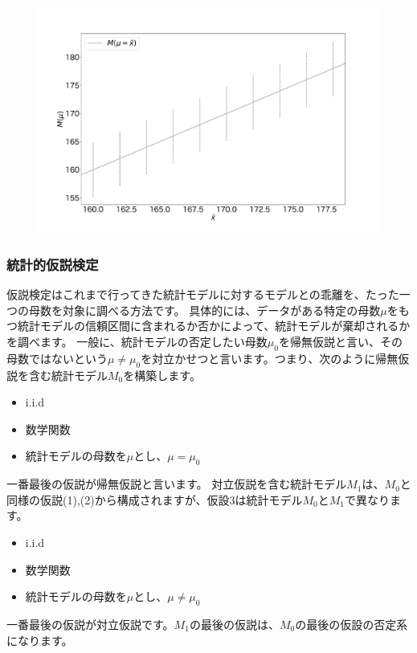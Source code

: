 \begin{figure}
\begin{center}
    \includegraphics[width=15cm]{./image/04_/confidence_interval_model.pdf}
  \end{center}
\end{figure}

\subsubsection{統計的仮説検定}
仮説検定はこれまで行ってきた統計モデルに対するモデルとの乖離を、たった一つの母数を対象に調べる方法です。
具体的には、データがある特定の母数$\mu$をもつ統計モデルの信頼区間に含まれるか否かによって、統計モデルが棄却されるかを調べます。
一般に、統計モデルの否定したい母数$\mu_0$を帰無仮説と言い、その母数ではないという$\mu\neq\mu_0$を対立かせつと言います。つまり、次のように帰無仮説を含む統計モデル$M_0$を構築します。
\begin{itemize}
    \item i.i.d
    \item 数学関数
    \item 統計モデルの母数を$\mu$とし、$\mu=\mu_0$
\end{itemize}
一番最後の仮説が帰無仮説と言います。
対立仮説を含む統計モデル$M_1$は、$M_0$と同様の仮説(1),(2)から構成されますが、仮設3は統計モデル$M_0$と$M_1$で異なります。
\begin{itemize}
    \item i.i.d
    \item 数学関数
    \item 統計モデルの母数を$\mu$とし、$\mu\neq\mu_0$
\end{itemize}
一番最後の仮説が対立仮説です。$M_1$の最後の仮説は、$M_0$の最後の仮設の否定系になります。

